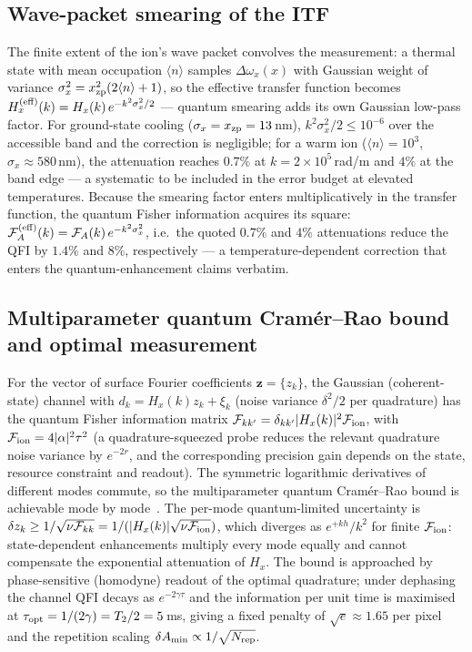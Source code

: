 \documentclass[12pt,a4paper]{article}
\begin{document}
\subsection{Wave-packet smearing of the ITF}
The finite extent of the ion's wave packet convolves the measurement:
a thermal state with mean occupation $\langle n\rangle$ samples
$\Delta\omega_x(x)$ with Gaussian weight of variance
$\sigma_x^2 = x_{\rm zp}^2(2\langle n\rangle+1)$, so the effective
transfer function becomes
$H_x^{\rm(eff)}(k) = H_x(k)\,e^{-k^2\sigma_x^2/2}$ --- quantum smearing
adds its own Gaussian low-pass factor.  For ground-state cooling
($\sigma_x=x_{\rm zp}=13$\,nm), $k^2\sigma_x^2/2\le10^{-6}$ over the
accessible band and the correction is negligible; for a warm ion
($\langle n\rangle=10^3$, $\sigma_x\approx580$\,nm), the attenuation
reaches $0.7\%$ at $k=2\times10^5$\,rad/m and $4\%$ at the band edge ---
a systematic to be included in the error budget at elevated temperatures.
Because the smearing factor enters multiplicatively in the transfer
function, the quantum Fisher information acquires its square:
$\mathcal F_A^{\rm(eff)}(k)=\mathcal F_A(k)\,e^{-k^2\sigma_x^2}$, i.e.~the
quoted $0.7\%$ and $4\%$ attenuations reduce the QFI by $1.4\%$ and
$8\%$, respectively --- a temperature-dependent correction that enters the
quantum-enhancement claims verbatim.

\subsection{Multiparameter quantum Cram\'er--Rao bound and optimal measurement}

For the vector of surface Fourier coefficients $\mathbf{z}=\{z_k\}$, the
Gaussian (coherent-state) channel with
$d_k=H_x(k)z_k+\xi_k$ (noise variance $\delta^2/2$ per quadrature) has the
quantum Fisher information matrix
$\mathcal{F}_{kk'}=\delta_{kk'}|H_x(k)|^2\mathcal{F}_{\rm ion}$, with
$\mathcal{F}_{\rm ion}=4|\alpha|^2\tau^2$ (a quadrature-squeezed probe
reduces the relevant quadrature noise variance by $e^{-2r}$, and the
corresponding precision gain depends on the state, resource constraint
and readout).  The symmetric logarithmic derivatives of
different modes
commute, so the multiparameter quantum Cram\'er--Rao bound is achievable
mode by mode~\cite{pezze2018quantum}.  The
per-mode quantum-limited uncertainty is
$\delta z_k\ge1/\sqrt{\nu\mathcal{F}_{kk}}
=1/(|H_x(k)|\sqrt{\nu\mathcal{F}_{\rm ion}})$,
which diverges as $e^{+kh}/k^2$ for finite $\mathcal{F}_{\rm ion}$:
state-dependent enhancements multiply every mode equally and cannot
compensate the exponential attenuation of $H_x$.  The bound is
approached by phase-sensitive (homodyne) readout of the optimal
quadrature; under dephasing the channel QFI
decays as $e^{-2\gamma\tau}$ and the information per unit time is
maximised at $\tau_{\rm opt}=1/(2\gamma)=T_2/2=5$\,ms, giving a fixed
penalty of $\sqrt{e}\approx1.65$ per pixel and the repetition scaling
$\delta A_{\min}\propto1/\sqrt{N_{\rm rep}}$.
\end{document}

